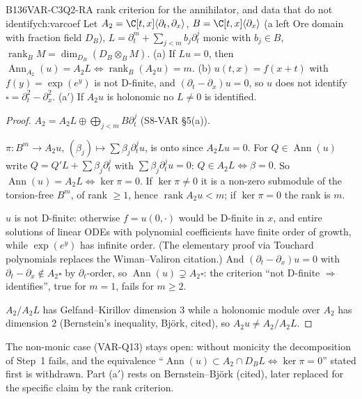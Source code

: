 \begin{dimcard}{B136}{VAR-C3Q2-R}{A rank criterion for the annihilator, and data that do not identify}{\pw}{ch:varcoef}
Let $A_2=\C[t,x]\langle\partial_t,\partial_x\rangle$, $B=\C[t,x]\langle\partial_x\rangle$ (a left Ore domain with fraction field $D_B$), $L=\partial_t^m+\sum_{j<m}b_j\partial_t^j$ monic with $b_j\in B$, $\operatorname{rank}_BM=\dim_{D_B}(D_B\otimes_BM)$. (a) If $Lu=0$, then $\operatorname{Ann}_{A_2}(u)=A_2L\iff\operatorname{rank}_B(A_2u)=m$. (b) $u(t,x)=f(x+t)$ with $f(y)=\exp(e^y)$ is not D-finite, and $(\partial_t-\partial_x)u=0$, so $u$ does not identify $\square=\partial_t^2-\partial_x^2$. (a$'$) If $A_2u$ is holonomic no $L\ne0$ is identified.
\end{dimcard}

\begin{proof}
$A_2=A_2L\oplus\bigoplus_{j<m}B\partial_t^j$ (S8-VAR \S5(a)).

$\pi:B^m\to A_2u$, $(\beta_j)\mapsto\sum\beta_j\partial_t^ju$, is onto since $A_2Lu=0$. For $Q\in\operatorname{Ann}(u)$ write $Q=Q'L+\sum\beta_j\partial_t^j$ with $\sum\beta_j\partial_t^ju=0$: $Q\in A_2L\iff\beta=0$. So $\operatorname{Ann}(u)=A_2L\iff\ker\pi=0$. If $\ker\pi\ne0$ it is a non-zero submodule of the torsion-free $B^m$, of rank $\ge1$, hence $\operatorname{rank}A_2u<m$; if $\ker\pi=0$ the rank is $m$.

$u$ is not D-finite: otherwise $f=u(0,\cdot)$ would be D-finite in $x$, and entire solutions of linear ODEs with polynomial coefficients have finite order of growth, while $\exp(e^y)$ has infinite order. (The elementary proof via Touchard polynomials replaces the Wiman--Valiron citation.) And $(\partial_t-\partial_x)u=0$ with $\partial_t-\partial_x\notin A_2\square$ by $\partial_t$-order, so $\operatorname{Ann}(u)\supsetneq A_2\square$: the criterion ``not D-finite $\Rightarrow$ identifies'', true for $m=1$, fails for $m\ge2$.

$A_2/A_2L$ has Gelfand--Kirillov dimension $3$ while a holonomic module over $A_2$ has dimension $2$ (Bernstein's inequality, Bj\"ork, cited), so $A_2u\ne A_2/A_2L$.

\end{proof}

\begin{caution}[title=Open]
The non-monic case (VAR-Q13) stays open: without monicity the decomposition of Step~1 fails, and the equivalence ``$\operatorname{Ann}(u)\subset A_2\cap D_BL\iff\ker\pi=0$'' stated first is withdrawn. Part (a$'$) rests on Bernstein--Bj\"ork (cited), later replaced for the specific claim by the rank criterion.
\end{caution}

